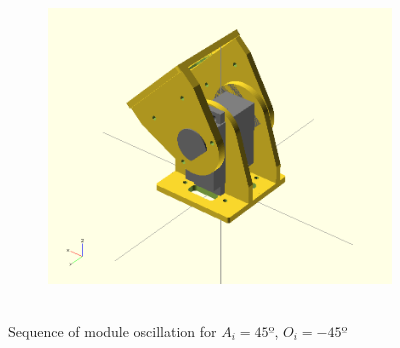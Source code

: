 \begin{figure}[h]
\begin{subfigure}[b]{0.18\textwidth}
                 ~
                \label{fig:Gait_osc_offset_22_5-3}
        \end{subfigure}
        ~
        \begin{subfigure}[b]{0.18\textwidth}
         	   \centering
                \includegraphics[width=\textwidth]{images/Gait_osc_offset_45.png}
                 ~
                \label{fig:Gait_osc_offset_45-3}
        \end{subfigure}
        \caption{Sequence of module oscillation for $A_i = 45º$, $O_i = -45º$}\label{fig:oscillator_offset_seq}
\end{figure}

